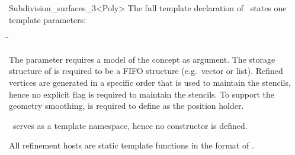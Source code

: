 \begin{ccRefClass}{Subdivision_surfaces_3<Poly>}
The full template declaration of \ccClassTemplateName\ states one
template parameters:

\begin{tabbing}
 \= 
\end{tabbing}
   
The parameter  requires a model of 
the  concept as argument. The storage structure
of  is required to be a FIFO structure (e.g.~vector or list).
Refined vertices are generated in a specific order that
is used to maintain the stencils, hence no explicit flag is required
to maintain the stencils. To support the geometry smoothing, 
is required to define  as the position holder.








\ccCreation
{}

\ccClassTemplateName\ serves as a template namespace, hence no constructor
is defined. 




All refinement hosts are static template functions in the format of
.

{}


\end{ccRefClass}
